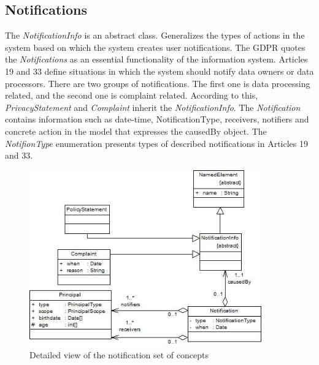 \documentclass[11pt,english]{article}
\begin{document}
\subsection{Notifications}
The \emph{NotificationInfo} is an abstract class. Generalizes the types of actions in the system based on which the system creates user notifications. The GDPR quotes the \emph{Notifications} as an essential functionality of the information system. Articles 19 and 33 define situations in which the system should notify data owners or data processors. There are two groups of notifications. The first one is data processing related, and the second one is complaint related. According to this, \emph{PrivacyStatement} and \emph{Complaint} inherit the \emph{NotificationInfo}. The \emph{Notification} contains information such as date-time, NotificationType, receivers, notifiers and concrete action in the model that expresses the causedBy object. The \emph{NotifionType} enumeration presents types of described notifications in Articles 19 and 33.
\begin{figure}[H]
    \centering
    \includegraphics[width=10cm,scale=0.5]{images/notification.jpg}
    \caption{Detailed view of the notification set of concepts}
    \label{fig:Notifications}
\end{figure}
\end{document}
